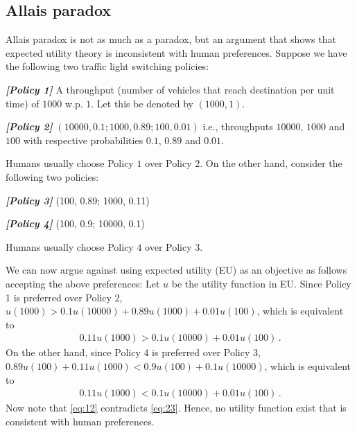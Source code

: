 \subsection*{Allais paradox}
Allais paradox is not as much as a paradox, but an argument that shows that 
expected utility theory is inconsistent with human preferences.
Suppose we have the following two traffic light switching policies:

\textbf{\textit{[Policy 1]}} A throughput (number of vehicles that reach destination per unit time) of $1000$  w.p. $1$. Let this be denoted by $(1000,1)$.

\textbf{\textit{[Policy 2]}}  $(10000, 0.1; 1000,0.89; 100, 0.01)$ i.e., throughputs $10000$, $1000$ and $100$ with respective probabilities $0.1$, $0.89$ and $0.01$.

Humans usually choose Policy $1$ over Policy $2$. On the other hand, consider the following two policies:

\textbf{\textit{[Policy 3]}} (100, 0.89; 1000, 0.11)

\textbf{\textit{[Policy 4]}} (100, 0.9; 10000, 0.1)

Humans usually choose Policy $4$ over Policy $3$. 

We can now argue against using expected utility (EU) as an objective as follows
accepting the above preferences: Let $u$ be the utility function in EU.
Since Policy 1 is preferred over Policy 2,
$u(1000) > 0.1 u(10000) + 0.89 u(1000) + 0.01 u(100)$, which is equivalent to
\begin{align}
0.11 u(1000) > 0.1 u(10000) + 0.01 u(100)\,.
 \label{eq:12}
\end{align}
On the other hand, since Policy 4 is preferred over Policy 3, 
$0.89 u(100) + 0.11 u(1000) < 0.9 u(100) + 0.1 u(10000)$, which is equivalent to
\begin{align}
 0.11 u(1000) < 0.1 u(10000) + 0.01 u(100) \,.\label{eq:23}
\end{align}
Now note that  \eqref{eq:12} contradicts \eqref{eq:23}. Hence, no utility function exist that is consistent with human preferences.

